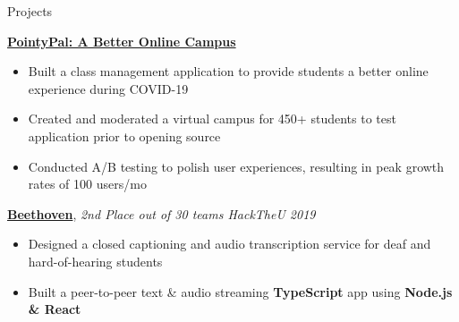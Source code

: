\documentclass{resume/resume}
\begin{document}
%
%
%

%
%
%
\begin{rSection}{Projects}

    \href{https://github.com/UtahTriangle/pointypal}{\bf PointyPal: A Better Online Campus}
    \vspace{-6pt}
    \begin{itemize}[nosep]
        \item Built a class management application to provide students a better online experience during COVID-19
        \item Created and moderated a virtual campus for 450+ students to test application prior to opening source 
        \item Conducted A/B testing to polish user experiences, resulting in peak growth rates of 100 users/mo
    \end{itemize}

    
    \href{https://devpost.com/software/beethoven-t9ud86}{\bf Beethoven}, {\em 2nd Place out of 30 teams
    \hfill HackTheU 2019}
    \vspace{-6pt}
    \begin{itemize}[nosep]
        \item Designed a closed captioning and audio transcription service for deaf and hard-of-hearing students
        \item Built a peer-to-peer text \& audio streaming {\bf TypeScript} app using {\bf Node.js \& React}
    \end{itemize}
    

\end{rSection}
\end{document}
